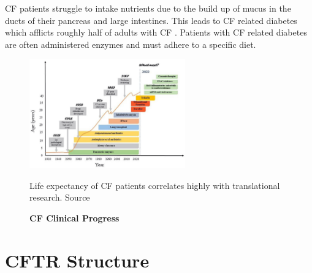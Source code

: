 CF patients struggle to intake nutrients due to the build up of mucus in the ducts of their pancreas and large intestines. This leads to CF related diabetes which afflicts roughly half of adults with CF \cite{Kayani2018}. Patients with CF related diabetes are often administered enzymes and must adhere to a specific diet. 

\begin{figure}
	\label{CF_life_expectancy}
	\begin{center}
	\includegraphics[width=0.6\textwidth]{figures/CF_life_expectancy.png}
	\end{center}
	\captionsetup{singlelinecheck = false, justification=raggedright}
	\caption[CF Clinical Progress] {\textbf{CF Clinical Progress}}{Life expectancy of CF patients correlates highly with translational research. Source \cite{garcia2022}} 
\end{figure}

\section{CFTR Structure}

